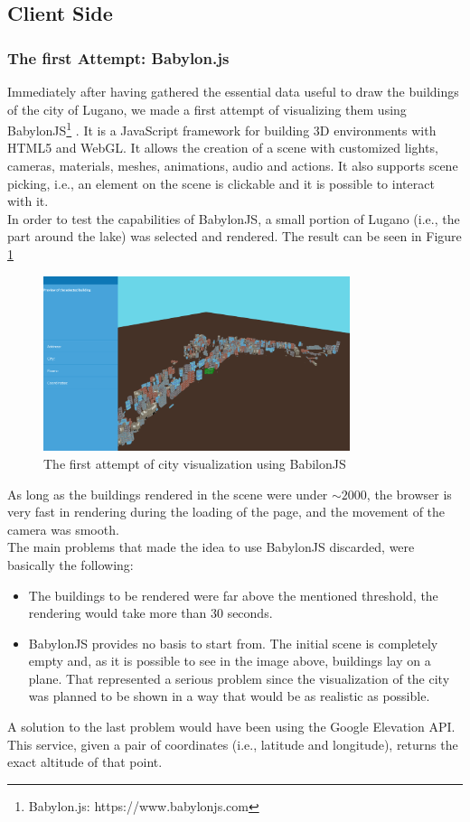 \subsection{Client Side}
\subsubsection{The first Attempt: Babylon.js}
Immediately after having gathered the essential data useful to draw the buildings of the city of Lugano, we made a first attempt of visualizing them using BabylonJS\footnote{Babylon.js: https://www.babylonjs.com} . It is a JavaScript framework for building 3D environments with HTML5 and WebGL. It allows the creation of a scene with customized lights, cameras, materials, meshes, animations, audio and actions. It also supports scene picking, i.e., an element on the scene is clickable and it is possible to interact with it.\\

In order to test the capabilities of BabylonJS, a small portion of Lugano (i.e., the part around the lake) was selected and rendered. The result can be seen in Figure \ref{fig:babilonJS}
\begin{figure}[H]
\centering
\includegraphics[width=0.8\textwidth]{chapter3/images/babylonJS}
\caption{The first attempt of city visualization using BabilonJS}
\label{fig:babilonJS}
\end{figure}
As long as the buildings rendered in the scene were under $\sim 2000$, the browser is very fast in rendering during the loading of the page, and the movement of the camera was smooth.\\
The main problems that made the idea to use BabylonJS discarded, were basically the following:
\begin{itemize}
	\item The buildings to be rendered were far above the mentioned threshold, the rendering would take more than 30 seconds.
	\item BabylonJS provides no basis to start from. The initial scene is completely empty and, as it is possible to see in the image above, buildings lay on a plane. That represented a serious problem since the visualization of the city was planned to be shown in a way that would be as realistic as possible.
\end{itemize}
A solution to the last problem would have been using the Google Elevation API. This service, given a pair of coordinates (i.e., latitude and longitude), returns the exact altitude of that point.\\

